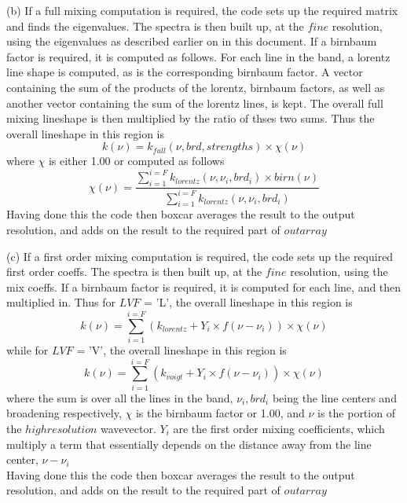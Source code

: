 \documentclass[11pt]{article}
\begin{document}
(b) If a full mixing computation is required, the code sets up the required 
    matrix and finds the eigenvalues. The spectra is then built up, at 
    the $fine$ resolution, using the eigenvalues as described earlier on 
    in this document. If a birnbaum factor is required, it
    is computed as follows. For each line in the band, a lorentz line 
    shape is computed, as is the corresponding birnbaum factor. A vector 
    containing the sum of the products of the lorentz, birnbaum factors, 
    as well as another vector containing the sum of the lorentz lines, is 
    kept. The overall full mixing lineshape is then multiplied by the 
    ratio of thses two sums. Thus the overall lineshape in this region is
\begin{equation}
k(\nu) = k_{full}(\nu,brd,strengths) \times \chi(\nu)
\end{equation}
where $\chi$ is either 1.00 or computed as follows
\begin{equation}
\chi(\nu) = 
\frac{\sum_{i=1}^{i=F} k_{lorentz}(\nu,\nu_{i},brd_{i}) \times birn(\nu)}
     {\sum_{i=1}^{i=F} k_{lorentz}(\nu,\nu_{i},brd_{i})}
\end{equation}
    Having done this the code then boxcar averages the result to the output
    resolution, and adds on the result to the required part of $outarray$

(c) If a first order mixing computation is required, the code sets up the 
    required first order coeffs. The spectra is then built up, at the $fine$
    resolution, using the mix coeffs. If a birnbaum factor is required, it
    is computed for each line, and then multiplied in. 
    Thus for $LVF$ = 'L', the overall lineshape in this region is
\begin{equation}
k(\nu) = \sum_{i=1}^{i=F} (k_{lorentz} + Y_{i} \times f(\nu - \nu_{i}))
\times \chi(\nu)
\end{equation}
    while for $LVF$ = 'V', the overall lineshape in this region is
\begin{equation}
k(\nu) = \sum_{i=1}^{i=F} (k_{voigt} + Y_{i} \times f(\nu - \nu_{i}))
\times \chi(\nu)
\end{equation}
    where the sum is over all the lines in the band, $\nu_{i},brd_{i}$ 
    being the line centers and broadening respectively, $\chi$ is the 
    birnbaum factor or 1.00, and $\nu$ is the portion of the $high 
    resolution$ wavevector. $Y_{i}$ are the first order mixing 
    coefficients, which multiply a term that essentially depends on the 
    distance away from the line center, $\nu - \nu_{i}$\\
    Having done this the code then boxcar averages the result to the output
    resolution, and adds on the result to the required part of $outarray$
\end{document}
